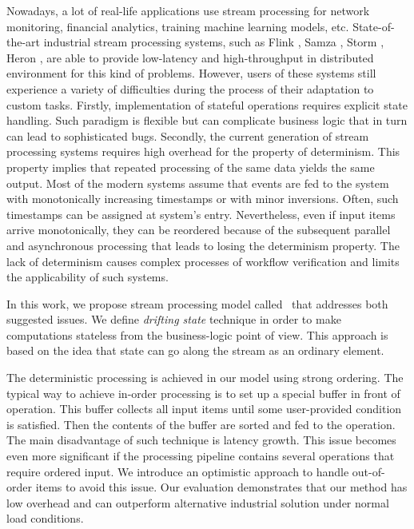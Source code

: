 
\label {fs-intro-seciton}

Nowadays, a lot of real-life applications use stream processing for network monitoring, financial analytics, training machine learning models, etc. State-of-the-art industrial stream processing systems, such as Flink \cite{carbone2015apache}, Samza \cite{Noghabi:2017:SSS:3137765.3137770}, Storm \cite{apache:storm}, Heron \cite{Kulkarni:2015:THS:2723372.2742788}, are able to provide low-latency and high-throughput in distributed environment for this kind of problems. However, users of these systems still experience a variety of difficulties during the process of their adaptation to custom tasks. Firstly, implementation of stateful operations requires explicit state handling. Such paradigm is flexible but can complicate business logic that in turn can lead to sophisticated bugs. Secondly, the current generation of stream processing systems requires high overhead for the property of determinism. This property implies that repeated processing of the same data yields the same output. Most of the modern systems assume that events are fed to the system with monotonically increasing timestamps or with minor inversions. Often, such timestamps can be assigned at system's entry. Nevertheless, even if input items arrive monotonically, they can be reordered because of the subsequent parallel and asynchronous processing that leads to losing the determinism property. The lack of determinism causes complex processes of workflow verification and limits the applicability of such systems.

In this work, we propose stream processing model called \FlameStream\ that addresses both suggested issues. We define {\it drifting state} technique in order to make computations stateless from the business-logic point of view. This approach is based on the idea that state can go along the stream as an ordinary element. 

The deterministic processing is achieved in our model using strong ordering. The typical way to achieve in-order processing is to set up a special buffer in front of operation. This buffer collects all input items until some user-provided condition is satisfied. Then the contents of the buffer are sorted and fed to the operation. The main disadvantage of such technique is latency growth. This issue becomes even more significant if the processing pipeline contains several operations that require ordered input. We introduce an optimistic approach to handle out-of-order items to avoid this issue. Our evaluation demonstrates that our method has low overhead and can outperform alternative industrial solution under normal load conditions.

